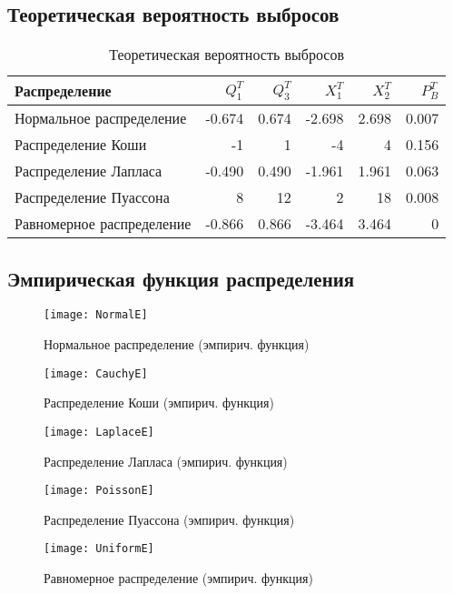 \documentclass[a4paper]{article}
\begin{document}
\subsection{Теоретическая вероятность выбросов}
\begin{table}[H]
\centering
\begin{tabular}[t]{lrrrrr}
	\hline
	Распределение   &      $Q_1^T$	& $Q_3^T$ & $X_1^T$ & $X_2^T$ & $P_B^T$	\\
	\hline
	Нормальное распределение 	& -0.674& 0.674 & -2.698 	&  2.698 	& 0.007 \\
	Распределение Коши 			& -1	& 1		&  -4		& 4			& 0.156 \\
	Распределение Лапласа 		&-0.490	& 0.490	& -1.961	& 1.961		& 0.063\\
	Распределение Пуассона 		& 8		& 12	& 2			& 18		& 0.008 \\
	Равномерное распределение 	&-0.866 & 0.866	& -3.464 	& 3.464 	& 0	\\
	
	\hline
\end{tabular}
\caption{Теоретическая вероятность выбросов}
\label{tab:ejectTeor}
\end{table}

\subsection{Эмпирическая функция распределения}
\begin{figure}[H]
	\centering
	\texttt{[image: NormalE]}
	\caption{Нормальное распределение (эмпирич. функция)} 
	\label{fig:normEmp}
\end{figure}

\begin{figure}[H]
	\centering
	\texttt{[image: CauchyE]}
	\caption{Распределение Коши (эмпирич. функция)} 
	\label{fig:cauchyEmp}
\end{figure}

\begin{figure}[H]
	\centering
	\texttt{[image: LaplaceE]}
	\caption{Распределение Лапласа (эмпирич. функция)} 
	\label{fig:laplaceEmp}
\end{figure}

\begin{figure}[H]
	\centering
	\texttt{[image: PoissonE]}
	\caption{Распределение Пуассона (эмпирич. функция)} 
	\label{fig:poissonEmp}
\end{figure}

\begin{figure}[H]
	\centering
	\texttt{[image: UniformE]}
	\caption{Равномерное распределение (эмпирич. функция)} 
	\label{fig:uniEmp}
\end{figure}
\end{document}
